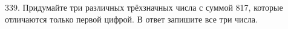 339. Придумайте три различных трёхзначных числа с суммой 817, которые отличаются только первой цифрой. В ответ запишите все три числа.\\
